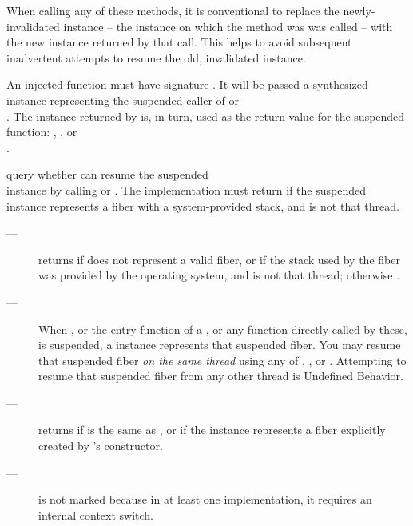 When calling any of these methods, it is conventional to replace the
newly-invalidated instance -- the instance on which the method was was called
-- with the new instance returned by that call. This helps to avoid subsequent
inadvertent attempts to resume the old, invalidated instance.

An injected function  must have signature
.
It will be passed a synthesized \fiber instance representing
the suspended caller of \resumewith or\\
\xtresumewith. The \fiber instance returned by  is, in turn, used as
the return value for the suspended function: \resume, \resumewith, \xtresume
or\\\xtresumewith.


\effects
query whether \currthread can resume the suspended\\
\fiber instance by
calling \xtresume or \xtresumewith. The implementation must return 
if the suspended \fiber instance represents a fiber with a system-provided
stack, and \currthread is not that thread.\\

\returns
\begin{description}
    \item[---]  returns 
        if  does not represent a valid fiber, or
        if the stack used by the fiber was provided by the operating system,
        and \currthread is not that thread; otherwise .
\end{description}

\remarks
\begin{description}
    \item[---] When , or the entry-function of a \thread, or any function
        directly called by these, is suspended, a \fiber instance represents that
        suspended fiber. You may resume that suspended fiber \emph{on the same thread}
        using any of \resume, \resumewith, \xtresume or \xtresumewith. Attempting to
        resume that suspended fiber from any other thread is Undefined Behavior.
    \item[---] \canxtresume returns  if \currthread is the same as \lastthread,
        or if the \fiber instance
        represents a fiber explicitly created by \fiber's constructor.
    \item[---] \canxtresume is not marked  because in at least one
        implementation, it requires an internal context switch.
\end{description}

